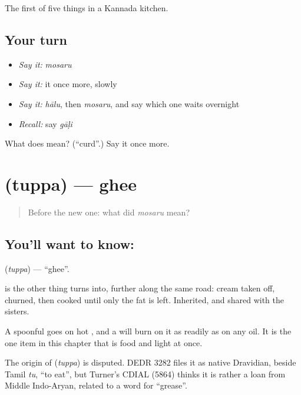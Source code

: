 \begin{grammarlens}[title={What you've built}]
The first of five things in a Kannada kitchen.
\end{grammarlens}

\subsection*{Your turn}
\begin{itemize}
\raggedright
  \item \emph{Say it:} \emph{mosaru}
  \item \emph{Say it:} it once more, slowly
  \item \emph{Say it:} \emph{hālu}, then \emph{mosaru}, and say which one waits overnight
  \item \emph{Recall:} say \emph{gāḷi}
\end{itemize}

\begin{tcolorbox}[breakable,colback=teal!4,colframe=teal!35!black,title={Before you move on}]
What does  mean? (\textquotedblleft{}curd\textquotedblright{}.) Say it once more.
\end{tcolorbox}
\section[\texorpdfstring{\kn{ತುಪ್ಪ} (tuppa)}{ತುಪ್ಪ (tuppa)}]{ (tuppa) — ghee}

\label{lesson:KA-C61-ghee}



\begin{quote}
Before the new one: what did \emph{mosaru} mean?
\end{quote}

\subsection*{You'll want to know: }
\textbf{} (\emph{tuppa}) — \textquotedblleft{}ghee\textquotedblright{}.

 is the other thing  turns into, further along the same road: cream taken off, churned, then cooked until only the fat is left. Inherited, and shared with the sisters.

A spoonful goes on hot , and a  will burn on it as readily as on any oil. It is the one item in this chapter that is food and light at once.

\begin{cousinweb}
The origin of \textbf{} (\emph{tuppa}) is disputed. DEDR 3282 files it as native Dravidian, beside Tamil \emph{tu}, \textquotedblleft{}to eat\textquotedblright{}, but Turner's CDIAL (5864) thinks it is rather a loan from Middle Indo-Aryan, related to a word for \textquotedblleft{}grease\textquotedblright{}.
\end{cousinweb}


